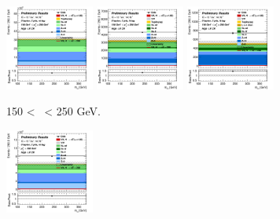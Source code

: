 \vspace*{\fill} 

\begin{figure}[h!]
    \centering
    \begin{subfigure}[b]{\textwidth}
        \centering
        \includegraphics[width=0.32\textwidth]{Images/VH/Own_fit/prefit_VHcc/Region_distmBB_BMax250_BMin150_DCRHigh_J2_TTypent_T1_L0_Y6051_Prefit.png}
        \includegraphics[width=0.32\textwidth]{Images/VH/Own_fit/prefit_VHcc/Region_distmBB_BMax250_BMin150_DCRHigh_J2_TTypelt_T2_L0_Y6051_Prefit.png}
        \includegraphics[width=0.32\textwidth]{Images/VH/Own_fit/prefit_VHcc/Region_distmBB_BMax250_BMin150_DCRHigh_J2_TTypett_T2_L0_Y6051_Prefit.png}
        \caption{150 < \ptv\ < 250 GeV.}
        \label{fig:plots_VHcc_OL_150_CRH_2c_2J}
    \end{subfigure}
    \begin{subfigure}[b]{\textwidth}
        \centering
        \includegraphics[width=0.32\textwidth]{Images/VH/Own_fit/prefit_VHcc/Region_distmBB_BMin250_DCRHigh_J2_TTypent_T1_L0_Y6051_Prefit.png}

\end{subfigure}
\end{figure}
